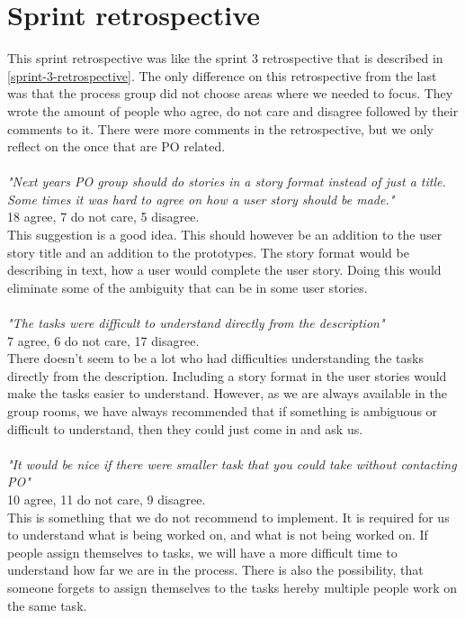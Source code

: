 \section{Sprint retrospective}
This sprint retrospective was like the sprint 3 retrospective that is described in \autoref{sprint-3-retrospective}.
The only difference on this retrospective from the last was that the process group did not choose areas where we needed to focus.
They wrote the amount of people who agree, do not care and disagree followed by their comments to it.
There were more comments in the retrospective, but we only reflect on the once that are PO related.
\\\\
\textit{"Next years PO group should do stories in a story format instead of just a title. Some times it was hard to agree on how a user story should be made."}
\\
18 agree, 7 do not care, 5 disagree.
\\
This suggestion is a good idea. 
This should however be an addition to the user story title and an addition to the prototypes. 
The story format would be describing in text, how a user would complete the user story. 
Doing this would eliminate some of the ambiguity that can be in some user stories.
\\\\
\textit{"The tasks were difficult to understand directly from the description"}
\\
7 agree, 6 do not care, 17 disagree.
\\
There doesn't seem to be a lot who had difficulties understanding the tasks directly from the description. 
Including a story format in the user stories would make the tasks easier to understand.
However, as we are always available in the group rooms, we have always recommended that if something is ambiguous or difficult to understand, then they could just come in and ask us. 
\\\\
\textit{"It would be nice if there were smaller task that you could take without contacting PO"}
\\
10 agree, 11 do not care, 9 disagree.
\\
This is something that we do not recommend to implement. 
It is required for us to understand what is being worked on, and what is not being worked on. 
If people assign themselves to tasks, we will have a more difficult time to understand how far we are in the process.
There is also the possibility, that someone forgets to assign themselves to the tasks hereby multiple people work on the same task.
